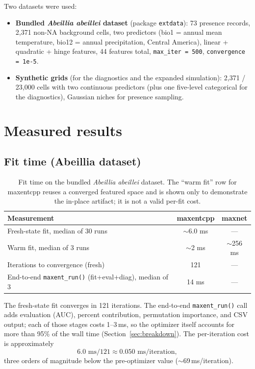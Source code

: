 Two datasets were used:

\begin{itemize}[leftmargin=1.2em]
\item \textbf{Bundled \emph{Abeillia abeillei} dataset} (package
  \texttt{extdata}): 73 presence records, 2,371 non-NA background
  cells, two predictors (bio1 = annual mean temperature, bio12 =
  annual precipitation, Central America), linear + quadratic + hinge
  features, 44 features total, \texttt{max\_iter = 500},
  \texttt{convergence = 1e-5}.
\item \textbf{Synthetic grids} (for the diagnostics and the expanded
  simulation): 2,371 / 23,000 cells with two continuous predictors
  (plus one five-level categorical for the diagnostics), Gaussian
  niches for presence sampling.
\end{itemize}

\section{Measured results}

\subsection{Fit time (Abeillia dataset)}
\label{sec:fit}

\begin{table}[h]
\centering
\small
\begin{tabular}{lcc}
\toprule
\textbf{Measurement} & \textbf{maxentcpp} & \textbf{maxnet} \\
\midrule
Fresh-state fit, median of 30 runs & $\sim$6.0 ms & --- \\
Warm fit, median of 3 runs & $\sim$2 ms & $\sim$256 ms \\
Iterations to convergence (fresh) & 121 & --- \\
End-to-end \texttt{maxent\_run()} (fit+eval+diag), median of 3 & 14 ms & --- \\
\bottomrule
\end{tabular}
\caption{Fit time on the bundled \emph{Abeillia abeillei} dataset.
The ``warm fit'' row for maxentcpp reuses a converged featured space and
is shown only to demonstrate the in-place artifact; it is not a valid
per-fit cost.}
\label{tab:fit}
\end{table}

The fresh-state fit converges in 121 iterations.  The end-to-end
\texttt{maxent\_run()} call adds evaluation (AUC), percent contribution,
permutation importance, and CSV output; each of those stages costs
1--3\,ms, so the optimizer itself accounts for more than 95\% of the
wall time (Section~\ref{sec:breakdown}).  The per-iteration cost is
approximately
\[
6.0\text{ ms} / 121 \approx 0.050\text{ ms/iteration},
\]
three orders of magnitude below the pre-optimizer value
($\sim$69\,ms/iteration).

